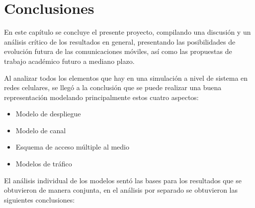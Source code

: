 
\chapter{Conclusiones} %

\label{Chapter8} %

En este capítulo se concluye el presente proyecto, compilando una discusión y un análisis crítico de los resultados en general, presentando las posibilidades de evolución futura de las comunicaciones móviles, así como las propuestas de trabajo académico futuro a mediano plazo.\newline


Al analizar todos los elementos que hay en una simulación a nivel de sistema en redes celulares, se llegó a la conclusión que se puede realizar una buena representación modelando principalmente estos cuatro aspectos:

\begin{itemize}
    \item Modelo de despliegue
    \item Modelo de canal
    \item Esquema de acceso múltiple al medio
    \item Modelos de tráfico
\end{itemize}

El análisis individual de los modelos sentó las bases para los resultados que se obtuvieron de manera conjunta, en el análisis por separado se obtuvieron las siguientes conclusiones:

